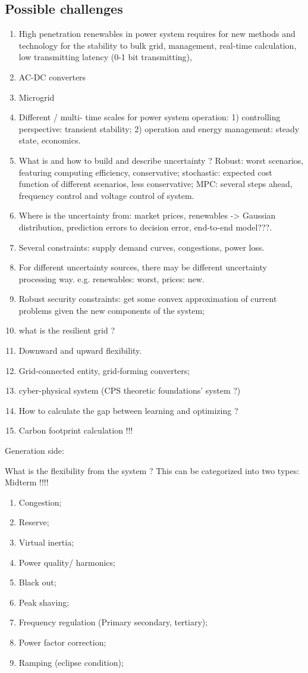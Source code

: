 \documentclass{article}
\begin{document}
\subsection{Possible challenges}
\begin{enumerate}
  \item High penetration renewables in power system requires for new methods and technology for the stability to bulk grid, management, real-time calculation, low transmitting latency (0-1 bit transmitting),  
  \item AC-DC converters
  \item Microgrid
  \item Different / multi- time scales for power system operation: 1) controlling perspective: transient stability; 2) operation and energy management: steady state, economics.
  \item What is and how to build and describe uncertainty ? Robust: worst scenarios, featuring computing efficiency, conservative; stochastic: expected cost function of different scenarios, less conservative; MPC: several steps ahead, frequency control and voltage control of system. 
  \item Where is the uncertainty from: market prices, renewables -> Gaussian distribution, prediction errors to decision error, end-to-end model???.
  \item Several constraints: supply demand curves, congestions, power loss.
  \item For different uncertainty sources, there may be different uncertainty processing way. e.g. renewables: worst, prices: new.
  \item Robust security constraints: get some convex approximation of current problems given the new components of the system;
  \item what is the resilient grid ?
  \item Downward and upward flexibility. 
  \item Grid-connected entity, grid-forming converters;
  \item cyber-physical system (CPS theoretic foundations' system ?)
  \item How to calculate the gap between learning and optimizing ?
  \item Carbon footprint calculation !!!
\end{enumerate}

Generation side:

What is the flexibility from the system ? This can be categorized into two types:
Midterm !!!!
\begin{enumerate}
  \item Congestion;
  \item Reserve;
  \item Virtual inertia;
  \item Power quality/ harmonics;
  \item Black out;
  \item Peak shaving;
  \item Frequency regulation (Primary secondary, tertiary);  
  \item Power factor correction; 
  \item Ramping (eclipse condition);
\end{enumerate}
\end{document}
